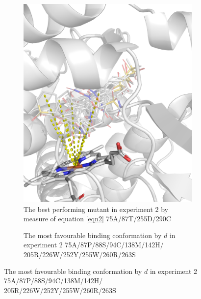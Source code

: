 \documentclass{article}
\begin{document}
\begin{figure}[H]
	\begin{subfigure}{0.49\textwidth}
		\caption{\label{exp2-best-mutant} The best performing mutant in experiment 2 by measure of equation \ref{eqn2} 75A/87T/255D/290C}
		\includegraphics[width=\linewidth]{figs/exp2-best-dock.png}
	\end{subfigure}
	\begin{subfigure}{0.49\textwidth}
		\caption{\label{exp2-best-binding} The most favourable binding conformation by $d$ in experiment 2 75A/87P/88S/94C/138M/142H/ 205R/226W/252Y/255W/260R/263S}

\end{subfigure}
\end{figure}
\end{document}
